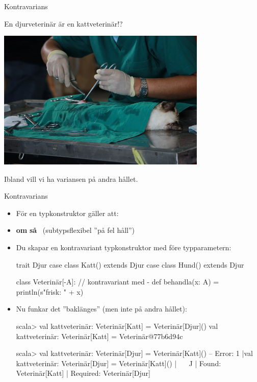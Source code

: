 \begin{Slide}{Kontravarians}
\begin{center}
En djurveterinär är en kattveterinär!?

\includegraphics[width=0.75\textwidth]{../img/cat-vet.jpg}  

Ibland vill vi ha variansen på andra hållet.
\end{center}
\end{Slide}

\begin{Slide}{Kontravarians }
\begin{itemize}\SlideFontSmall
\item För en  typkonstruktor  gäller att: 
\item[] \textbf{om}  \textbf{så} ~(subtypsflexibel ''på fel håll'')
\item Du skapar en kontravariant typkonstruktor med \code{-} före typparametern:
\begin{Code}
trait Djur 
case class Katt() extends Djur
case class Hund() extends Djur

class Veterinär[-A]:                            // kontravariant med -
  def behandla(x: A) = println(s"frisk: " + x)  
\end{Code}
\pause
\item Nu funkar det ''baklänges'' (men inte på andra hållet):
\begin{REPLsmall}
scala> val kattveterinär: Veterinär[Katt] = Veterinär[Djur]()
val kattveterinär: Veterinär[Katt] = Veterinär@77b6d94c

scala> val kattveterinär: Veterinär[Djur] = Veterinär[Katt]()
-- Error:
1 |val kattveterinär: Veterinär[Djur] = Veterinär[Katt]()
  |                                     ^^^^^^^^^^^^^^^^^
  |                                     Found:    Veterinär[Katt]
  |                                     Required: Veterinär[Djur]
\end{REPLsmall}
\end{itemize}

\end{Slide}

